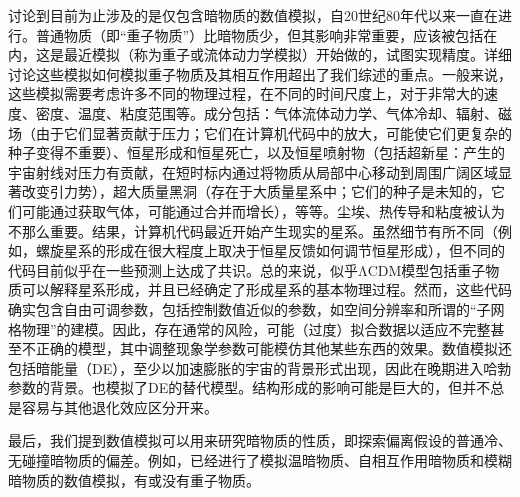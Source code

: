 讨论到目前为止涉及的是仅包含暗物质的数值模拟，自20世纪80年代以来一直在进行。普通物质（即“重子物质”）比暗物质少，但其影响非常重要，应该被包括在内，这是最近模拟（称为重子或流体动力学模拟）开始做的，试图实现精度。详细讨论这些模拟如何模拟重子物质及其相互作用超出了我们综述的重点。一般来说，这些模拟需要考虑许多不同的物理过程，在不同的时间尺度上，对于非常大的速度、密度、温度、粘度范围等。成分包括：气体流体动力学、气体冷却、辐射、磁场（由于它们显著贡献于压力；它们在计算机代码中的放大，可能使它们更复杂的种子变得不重要）、恒星形成和恒星死亡，以及恒星喷射物（包括超新星：产生的宇宙射线对压力有贡献，在短时标内通过将物质从局部中心移动到周围广阔区域显著改变引力势），超大质量黑洞（存在于大质量星系中；它们的种子是未知的，它们可能通过获取气体，可能通过合并而增长），等等。尘埃、热传导和粘度被认为不那么重要。结果，计算机代码最近开始产生现实的星系。虽然细节有所不同（例如，螺旋星系的形成在很大程度上取决于恒星反馈如何调节恒星形成），但不同的代码目前似乎在一些预测上达成了共识。总的来说，似乎ΛCDM模型包括重子物质可以解释星系形成，并且已经确定了形成星系的基本物理过程。然而，这些代码确实包含自由可调参数，包括控制数值近似的参数，如空间分辨率和所谓的“子网格物理”的建模。因此，存在通常的风险，可能（过度）拟合数据以适应不完整甚至不正确的模型，其中调整现象学参数可能模仿其他某些东西的效果。数值模拟还包括暗能量（DE），至少以加速膨胀的宇宙的背景形式出现，因此在晚期进入哈勃参数的背景。也模拟了DE的替代模型。结构形成的影响可能是巨大的，但并不总是容易与其他退化效应区分开来。

最后，我们提到数值模拟可以用来研究暗物质的性质，即探索偏离假设的普通冷、无碰撞暗物质的偏差。例如，已经进行了模拟温暗物质、自相互作用暗物质和模糊暗物质的数值模拟，有或没有重子物质。
